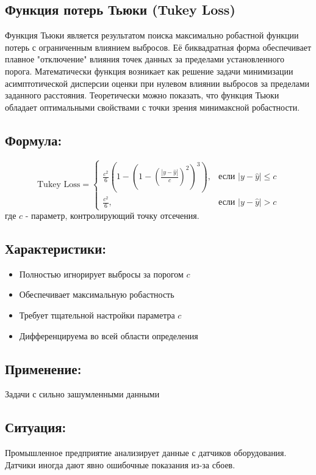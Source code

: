 \subsection{Функция потерь Тьюки (Tukey Loss)}

Функция Тьюки является результатом поиска максимально робастной функции потерь с ограниченным влиянием выбросов. Её биквадратная форма обеспечивает плавное "отключение" влияния точек данных за пределами установленного порога. Математически функция возникает как решение задачи минимизации асимптотической дисперсии оценки при нулевом влиянии выбросов за пределами заданного расстояния. Теоретически можно показать, что функция Тьюки обладает оптимальными свойствами с точки зрения минимаксной робастности.

\subsection*{Формула:}
\[
    \text{Tukey Loss} =
    \begin{cases}
        \frac{c^2}{6} \left(1 - \left(1 - \left(\frac{|y - \hat{y}|}{c}\right)^2\right)^3\right), & \text{если } |y - \hat{y}| \leq c \\
        \frac{c^2}{6},                                                                            & \text{если } |y - \hat{y}| > c
    \end{cases}
\]
где $c$ - параметр, контролирующий точку отсечения.

\subsection*{Характеристики:}
\begin{itemize}
    \item Полностью игнорирует выбросы за порогом $c$
    \item Обеспечивает максимальную робастность
    \item Требует тщательной настройки параметра $c$
    \item Дифференцируема во всей области определения
\end{itemize}

\subsection*{Применение:} Задачи с сильно зашумленными данными

\subsection*{Ситуация:} Промышленное предприятие анализирует данные с датчиков оборудования. Датчики иногда дают явно ошибочные показания из-за сбоев.

